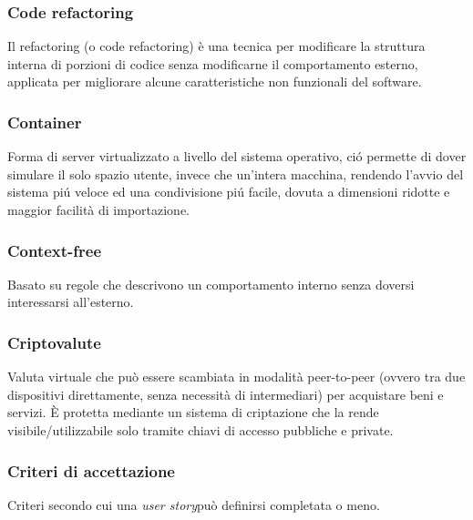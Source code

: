 \subsubsection*{Code refactoring}
Il refactoring (o code refactoring) è una tecnica per modificare la struttura interna di porzioni di codice senza modificarne il comportamento esterno, applicata per migliorare alcune caratteristiche non funzionali del software.
\subsubsection*{Container}
Forma di server virtualizzato a livello del sistema operativo, ció permette di dover simulare il solo spazio utente, invece che un’intera macchina, rendendo l’avvio del sistema piú veloce ed una condivisione piú facile, dovuta a dimensioni ridotte e maggior facilità di importazione.
\subsubsection*{Context-free}
Basato su regole che descrivono un comportamento interno senza doversi interessarsi all'esterno.
\subsubsection*{Criptovalute}
Valuta virtuale che può essere scambiata in modalità peer-to-peer (ovvero tra due dispositivi direttamente, senza necessità di intermediari) per acquistare beni e servizi. È protetta mediante un sistema di criptazione che la rende visibile/utilizzabile solo tramite chiavi di accesso pubbliche e private.
\subsubsection*{Criteri di accettazione}
Criteri secondo cui una \textit{user story}\glo può definirsi completata o meno.
